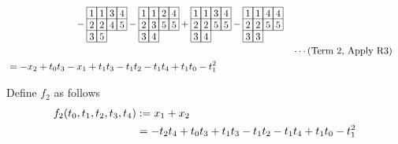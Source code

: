 \begin{align*}
\begin{array}[c]{*{4}c}
\end{array}
\\
&\hspace{70pt}
-\begin{array}[c]{*{4}c}\cline{1-4}
\lr{1}&\lr{1}&\lr{3}&\lr{4}\\\cline{1-4}
\lr{2}&\lr{2}&\lr{4}&\lr{5}\\\cline{1-4}
\lr{3}&\lr{5}\\\cline{1-2}
\end{array}
-\begin{array}[c]{*{4}c}\cline{1-4}
\lr{1}&\lr{1}&\lr{2}&\lr{4}\\\cline{1-4}
\lr{2}&\lr{3}&\lr{5}&\lr{5}\\\cline{1-4}
\lr{3}&\lr{4}\\\cline{1-2}
\end{array}
+\begin{array}[c]{*{4}c}\cline{1-4}
\lr{1}&\lr{1}&\lr{3}&\lr{4}\\\cline{1-4}
\lr{2}&\lr{2}&\lr{5}&\lr{5}\\\cline{1-4}
\lr{3}&\lr{4}\\\cline{1-2}
\end{array}
-\begin{array}[c]{*{4}c}\cline{1-4}
\lr{1}&\lr{1}&\lr{4}&\lr{4}\\\cline{1-4}
\lr{2}&\lr{2}&\lr{5}&\lr{5}\\\cline{1-4}
\lr{3}&\lr{3}\\\cline{1-2}
\end{array}
\\
& &&\cdots (\text{Term 2, Apply R3})\\
&=
-x_2 + t_0t_3 - x_1 + t_1t_3 - t_1t_2 - t_1t_4 + t_1t_0 - t_1^2
\end{align*}

Define \(f_2\) as follows
\begin{align*}
    f_2(t_0,t_1,t_2,t_3,t_4) &:= x_1 + x_2\\ 
    & = - t_2t_4 + t_0t_3 + t_1t_3 - t_1t_2 - t_1t_4 + t_1t_0 - t_1^2
\end{align*}
